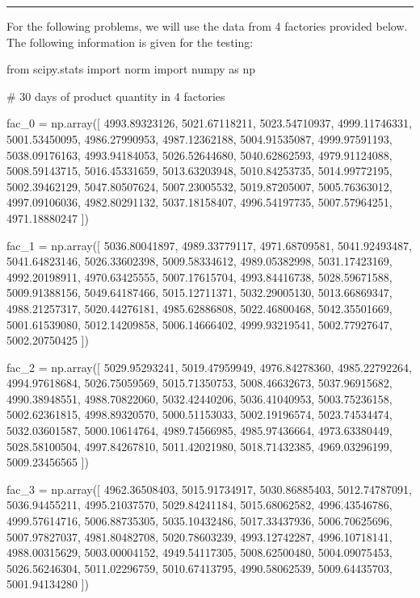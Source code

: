 \documentclass[a4paper, 10pt]{article}
\begin{document}
\begin{tosubmit}
\vspace{3mm} \hrule \vspace{3mm}

For the following problems, we will use the data from 4 factories provided below.
The following information is given for the testing:
\begin{codingbox}
from scipy.stats import norm
import numpy as np

# 30 days of product quantity in 4 factories

fac_0 = np.array([
    4993.89323126, 5021.67118211, 5023.54710937,
    4999.11746331, 5001.53450095, 4986.27990953,
    4987.12362188, 5004.91535087, 4999.97591193,
    5038.09176163, 4993.94184053, 5026.52644680,
    5040.62862593, 4979.91124088, 5008.59143715,
    5016.45331659, 5013.63203948, 5010.84253735,
    5014.99772195, 5002.39462129, 5047.80507624,
    5007.23005532, 5019.87205007, 5005.76363012,
    4997.09106036, 4982.80291132, 5037.18158407,
    4996.54197735, 5007.57964251, 4971.18880247
])
\end{codingbox}

\begin{codingbox}
fac_1 = np.array([
    5036.80041897, 4989.33779117, 4971.68709581,
    5041.92493487, 5041.64823146, 5026.33602398,
    5009.58334612, 4989.05382998, 5031.17423169,
    4992.20198911, 4970.63425555, 5007.17615704,
    4993.84416738, 5028.59671588, 5009.91388156,
    5049.64187466, 5015.12711371, 5032.29005130,
    5013.66869347, 4988.21257317, 5020.44276181,
    4985.62886808, 5022.46800468, 5042.35501669,
    5001.61539080, 5012.14209858, 5006.14666402,
    4999.93219541, 5002.77927647, 5002.20750425
])

fac_2 = np.array([
    5029.95293241, 5019.47959949, 4976.84278360,
    4985.22792264, 4994.97618684, 5026.75059569,
    5015.71350753, 5008.46632673, 5037.96915682,
    4990.38948551, 4988.70822060, 5032.42440206,
    5036.41040953, 5003.75236158, 5002.62361815,
    4998.89320570, 5000.51153033, 5002.19196574,
    5023.74534474, 5032.03601587, 5000.10614764,
    4989.74566985, 4985.97436664, 4973.63380449,
    5028.58100504, 4997.84267810, 5011.42021980,
    5018.71432385, 4969.03296199, 5009.23456565
])

fac_3 = np.array([
    4962.36508403, 5015.91734917, 5030.86885403,
    5012.74787091, 5036.94455211, 4995.21037570,
    5029.84241184, 5015.68062582, 4996.43546786,
    4999.57614716, 5006.88735305, 5035.10432486,
    5017.33437936, 5006.70625696, 5007.97827037,
    4981.80482708, 5020.78603239, 4993.12742287,
    4996.10718141, 4988.00315629, 5003.00004152,
    4949.54117305, 5008.62500480, 5004.09075453,
    5026.56246304, 5011.02296759, 5010.67413795,
    4990.58062539, 5009.64435703, 5001.94134280
])
\end{codingbox}


\end{tosubmit}
\end{document}
